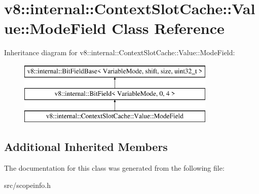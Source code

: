 \hypertarget{classv8_1_1internal_1_1_context_slot_cache_1_1_value_1_1_mode_field}{}\section{v8\+:\+:internal\+:\+:Context\+Slot\+Cache\+:\+:Value\+:\+:Mode\+Field Class Reference}
\label{classv8_1_1internal_1_1_context_slot_cache_1_1_value_1_1_mode_field}
Inheritance diagram for v8\+:\+:internal\+:\+:Context\+Slot\+Cache\+:\+:Value\+:\+:Mode\+Field\+:\begin{figure}[H]
\begin{center}
\leavevmode
\includegraphics[height=3.000000cm]{classv8_1_1internal_1_1_context_slot_cache_1_1_value_1_1_mode_field}
\end{center}
\end{figure}
\subsection*{Additional Inherited Members}


The documentation for this class was generated from the following file\+:\begin{DoxyCompactItemize}
\item 
src/scopeinfo.\+h\end{DoxyCompactItemize}
